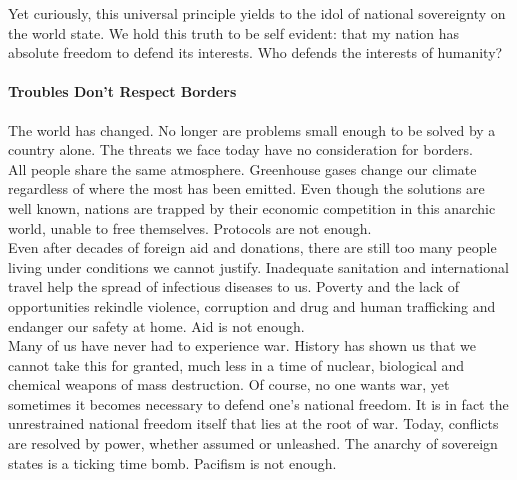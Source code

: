 \documentclass[11pt,a4paper]{article}
\begin{document}
\begin{multicols}{2}
\noindent Yet curiously, this universal principle yields to the idol of national sovereignty on the world state.
We hold this truth to be self evident: that my nation has absolute freedom to defend its interests.  
Who defends the interests of humanity?

\end{multicols}
\paragraph{Troubles Don't Respect Borders}

The world has changed. No longer are problems small enough to be solved by a country alone.
The threats we face today have no consideration for borders.\\
\noindent All people share the same atmosphere.
Greenhouse gases change our climate regardless of where the most has been emitted.
Even though the solutions are well known, nations are trapped by their economic competition in this anarchic world, unable to free themselves. \hfill Protocols are not enough.\\
\noindent Even after decades of foreign aid and donations, there are still too many people living under conditions we cannot justify.
Inadequate sanitation and international travel help the spread of infectious diseases to us.
Poverty and the lack of opportunities rekindle violence, corruption and drug and human trafficking and endanger our safety at home.
\hfill Aid is not enough.\\
\noindent Many of us have never had to experience war.
History has shown us that we cannot take this for granted, much less in a time of nuclear, biological and chemical weapons of mass destruction.
Of course, no one wants war, yet sometimes it becomes necessary to defend one's national freedom.
It is in fact the unrestrained national freedom itself that lies at the root of war.
Today, conflicts are resolved by power, whether assumed or unleashed.
The anarchy of sovereign states is a ticking time bomb. \hfill Pacifism is not enough.
\end{document}
